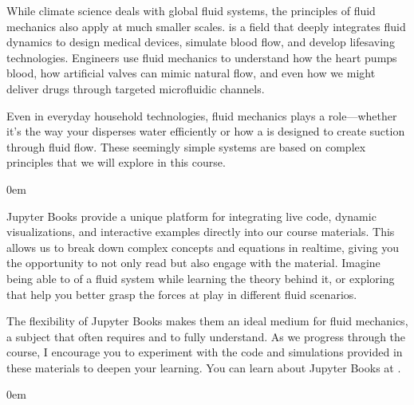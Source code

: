 \documentclass[letterpaper,10pt,english]{jupyterBook}
\begin{document}
\sphinxAtStartPar
While climate science deals with global fluid systems, the principles of fluid mechanics also apply at much smaller scales.  is a field that deeply integrates fluid dynamics to design medical devices, simulate blood flow, and develop life\sphinxhyphen{}saving technologies. Engineers use fluid mechanics to understand how the heart pumps blood, how artificial valves can mimic natural flow, and even how we might deliver drugs through targeted microfluidic channels.

\sphinxAtStartPar
Even in everyday household technologies, fluid mechanics plays a role—whether it’s the way your  disperses water efficiently or how a  is designed to create suction through fluid flow. These seemingly simple systems are based on complex principles that we will explore in this course.

\begin{DUlineblock}{0em}
\item[] 
\end{DUlineblock}

\sphinxAtStartPar
Jupyter Books provide a unique platform for integrating live code, dynamic visualizations, and interactive examples directly into our course materials. This allows us to break down complex concepts and equations in real\sphinxhyphen{}time, giving you the opportunity to not only read but also engage with the material. Imagine being able to  of a fluid system while learning the theory behind it, or exploring  that help you better grasp the forces at play in different fluid scenarios.

\sphinxAtStartPar
The flexibility of Jupyter Books makes them an ideal medium for fluid mechanics, a subject that often requires  and  to fully understand. As we progress through the course, I encourage you to experiment with the code and simulations provided in these materials to deepen your learning. You can learn about Jupyter Books at .

\begin{DUlineblock}{0em}
\item[] 
\end{DUlineblock}
\end{document}
